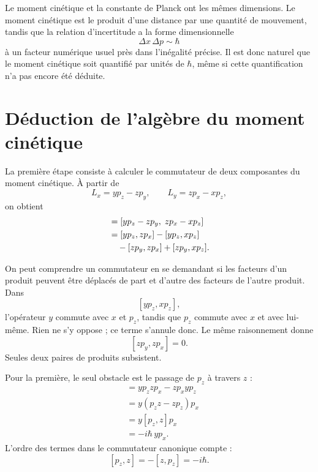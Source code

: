 Le moment cinétique et la constante de Planck ont les mêmes dimensions. Le moment cinétique est le produit d’une distance par une quantité de mouvement, tandis que la relation d’incertitude a la forme dimensionnelle
\begin{equation}
\Delta x\,\Delta p\sim\hbar
\end{equation}
à un facteur numérique usuel près dans l’inégalité précise. Il est donc naturel que le moment cinétique soit quantifié par unités de \(\hbar\), même si cette quantification n’a pas encore été déduite.

\section{Déduction de l’algèbre du moment cinétique}

La première étape consiste à calculer le commutateur de deux composantes du moment cinétique. À partir de
\[
L_x=yp_z-zp_y,\qquad
L_y=zp_x-xp_z,
\]
on obtient
\begin{align}
[L_x,L_y]
&=[yp_z-zp_y,\;zp_x-xp_z] \\
&=[yp_z,zp_x]-[yp_z,xp_z] \notag\\
&\quad{}-[zp_y,zp_x]+[zp_y,xp_z].
\end{align}

\begin{classroomqa}
\end{classroomqa}

On peut comprendre un commutateur en se demandant si les facteurs d’un produit peuvent être déplacés de part et d’autre des facteurs de l’autre produit. Dans
\[
[yp_z,xp_z],
\]
l’opérateur \(y\) commute avec \(x\) et \(p_z\), tandis que \(p_z\) commute avec \(x\) et avec lui-même. Rien ne s’y oppose ; ce terme s’annule donc. Le même raisonnement donne
\[
[zp_y,zp_x]=0.
\]
Seules deux paires de produits subsistent.

Pour la première, le seul obstacle est le passage de \(p_z\) à travers \(z\) :
\begin{align}
[yp_z,zp_x]
&=yp_zzp_x-zp_xyp_z \\
&=y(p_zz-zp_z)p_x \\
&=y[p_z,z]p_x \\
&=-i\hbar\,yp_x.
\end{align}
L’ordre des termes dans le commutateur canonique compte :
\[
[p_z,z]=-[z,p_z]=-i\hbar.
\]

